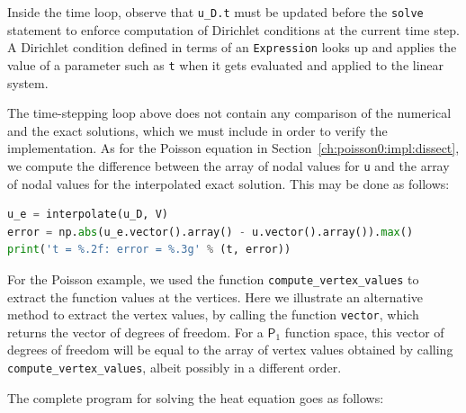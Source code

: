 \documentclass[graybox,envcountchap,sectrefs,final]{svmonodo}
\newenvironment{warning_mdfboxadmon}[1][]{
\begin{warning_mdfboxmdframed}[frametitle=#1]
}
{
\end{warning_mdfboxmdframed}
}
\begin{document}
\begin{warning_mdfboxadmon}
Inside the time loop, observe that \Verb!u_D.t! must be updated before the
\texttt{solve} statement to enforce computation of Dirichlet conditions at
the current time step. A Dirichlet condition defined in terms of an
\texttt{Expression} looks up and applies the value of a parameter such as \texttt{t}
when it gets evaluated and applied to the linear system.
\end{warning_mdfboxadmon} %



The time-stepping loop above does not contain any comparison of the
numerical and the exact solutions, which we must include in order to
verify the implementation. As for the Poisson equation in
Section~\ref{ch:poisson0:impl:dissect}, we compute the difference
between the array of nodal values for \texttt{u} and the array of nodal
values for the interpolated exact solution. This may be done as
follows:

\begin{lstlisting}[language=Python,style=graycolor]
u_e = interpolate(u_D, V)
error = np.abs(u_e.vector().array() - u.vector().array()).max()
print('t = %.2f: error = %.3g' % (t, error))
\end{lstlisting}
For the Poisson example, we used the function
\Verb!compute_vertex_values! to extract the function values at the
vertices. Here we illustrate an alternative method to extract the
vertex values, by calling the function \texttt{vector}, which returns
the vector of degrees of freedom. For a $\mathsf{P}_1$
function space, this vector of degrees of freedom will be equal to
the array of vertex values obtained by calling
\Verb!compute_vertex_values!, albeit possibly in a different order.

The complete program for solving the heat equation goes as follows:
\end{document}
